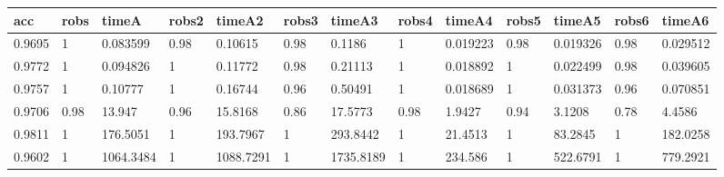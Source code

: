 \begin{tabular}{lllllllllllll}
acc & robs & timeA & robs2 & timeA2 & robs3 & timeA3 & robs4 & timeA4 & robs5 & timeA5 & robs6 & timeA6 \\ 
\hline 
0.9695 & 1 & 0.083599 & 0.98 & 0.10615 & 0.98 & 0.1186 & 1 & 0.019223 & 0.98 & 0.019326 & 0.98 & 0.029512 \\ 
0.9772 & 1 & 0.094826 & 1 & 0.11772 & 0.98 & 0.21113 & 1 & 0.018892 & 1 & 0.022499 & 0.98 & 0.039605 \\ 
0.9757 & 1 & 0.10777 & 1 & 0.16744 & 0.96 & 0.50491 & 1 & 0.018689 & 1 & 0.031373 & 0.96 & 0.070851 \\ 
0.9706 & 0.98 & 13.947 & 0.96 & 15.8168 & 0.86 & 17.5773 & 0.98 & 1.9427 & 0.94 & 3.1208 & 0.78 & 4.4586 \\ 
0.9811 & 1 & 176.5051 & 1 & 193.7967 & 1 & 293.8442 & 1 & 21.4513 & 1 & 83.2845 & 1 & 182.0258 \\ 
0.9602 & 1 & 1064.3484 & 1 & 1088.7291 & 1 & 1735.8189 & 1 & 234.586 & 1 & 522.6791 & 1 & 779.2921 \\ 
\hline 
\end{tabular}